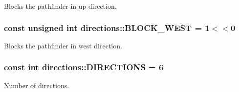 Blocks the pathfinder in up direction. \hypertarget{namespacedirections_ad1c6d7e5b1f142442ae7a7d527281e9f}{
\subsubsection[{B\-L\-O\-C\-K\-\_\-\-W\-E\-S\-T}]{\setlength{\rightskip}{0pt plus 5cm}const unsigned int directions\-::\-B\-L\-O\-C\-K\-\_\-\-W\-E\-S\-T = 1$<$$<$0}}\label{namespacedirections_ad1c6d7e5b1f142442ae7a7d527281e9f}
Blocks the pathfinder in west direction. \hypertarget{namespacedirections_ae9cfa895df6c71a9a932353c2d698748}{
\subsubsection[{D\-I\-R\-E\-C\-T\-I\-O\-N\-S}]{\setlength{\rightskip}{0pt plus 5cm}const int directions\-::\-D\-I\-R\-E\-C\-T\-I\-O\-N\-S = 6}}\label{namespacedirections_ae9cfa895df6c71a9a932353c2d698748}


Number of directions. 

